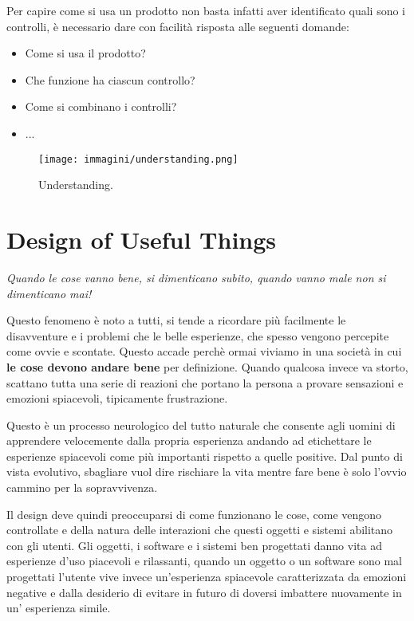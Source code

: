 Per capire come si usa un prodotto non basta infatti aver identificato quali sono i controlli, è necessario dare con facilità risposta
alle seguenti domande:

\begin{itemize}
	\itemsep-0.3em
    \item Come si usa il prodotto?
    \item Che funzione ha ciascun controllo?
    \item Come si combinano i controlli?
    \item...
\end{itemize}

\begin{figure}[!h]
	\centering
	\texttt{[image: immagini/understanding.png]}
	\caption{Understanding.}
\end{figure}


\section{Design of Useful Things}
\begin{flushleft}
	\textit{Quando le cose vanno bene, si dimenticano subito, quando vanno male non si dimenticano mai!}
\end{flushleft}

Questo fenomeno è noto a tutti, si tende a ricordare più facilmente le disavventure e i problemi che le belle esperienze, che spesso
vengono percepite come ovvie e scontate. Questo accade perchè ormai viviamo in una società in cui \textbf{le cose devono andare bene}
per definizione. Quando qualcosa invece va storto, scattano tutta una serie di reazioni che portano la persona a provare sensazioni e
emozioni spiacevoli, tipicamente frustrazione. 

Questo è un processo neurologico del tutto naturale che consente agli uomini di apprendere velocemente dalla propria esperienza andando
ad etichettare le esperienze spiacevoli come più importanti rispetto a quelle positive. Dal punto di vista evolutivo, sbagliare vuol dire
rischiare la vita mentre fare bene è solo l'ovvio cammino per la sopravvivenza.

Il design deve quindi preoccuparsi di come funzionano le cose, come vengono controllate e della natura delle interazioni che questi
oggetti e sistemi abilitano con gli utenti. Gli oggetti, i software e i sistemi ben progettati danno vita ad esperienze d'uso piacevoli
e rilassanti, quando un oggetto o un software sono mal progettati l'utente vive invece un'esperienza spiacevole caratterizzata da
emozioni negative e dalla desiderio di evitare in futuro di doversi imbattere nuovamente in un' esperienza simile.

